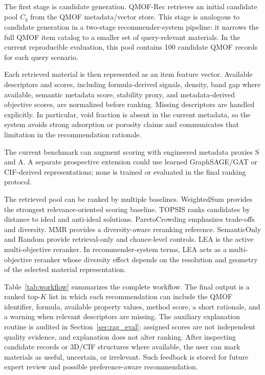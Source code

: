 \documentclass[12pt,a4paper]{article}
\begin{document}
The first stage is candidate generation. QMOF-Rec retrieves an initial candidate pool $C_q$ from the QMOF metadata/vector store. This stage is analogous to candidate generation in a two-stage recommender-system pipeline: it narrows the full QMOF item catalog to a smaller set of query-relevant materials. In the current reproducible evaluation, this pool contains 100 candidate QMOF records for each query scenario.

Each retrieved material is then represented as an item feature vector. Available descriptors and scores, including formula-derived signals, density, band gap where available, semantic metadata score, stability proxy, and metadata-derived objective scores, are normalized before ranking. Missing descriptors are handled explicitly. In particular, void fraction is absent in the current metadata, so the system avoids strong adsorption or porosity claims and communicates that limitation in the recommendation rationale.

The current benchmark can augment scoring with engineered metadata proxies S and A. A separate prospective extension could use learned GraphSAGE/GAT or CIF-derived representations; none is trained or evaluated in the final ranking protocol.

The retrieved pool can be ranked by multiple baselines. WeightedSum provides the strongest relevance-oriented scoring baseline. TOPSIS ranks candidates by distance to ideal and anti-ideal solutions. ParetoCrowding emphasizes trade-offs and diversity. MMR provides a diversity-aware reranking reference. SemanticOnly and Random provide retrieval-only and chance-level controls. LEA is the active multi-objective reranker. In recommender-system terms, LEA acts as a multi-objective reranker whose diversity effect depends on the resolution and geometry of the selected material representation.

Table~\ref{tab:workflow} summarizes the complete workflow. The final output is a ranked top-$K$ list in which each recommendation can include the QMOF identifier, formula, available property values, method score, a short rationale, and a warning when relevant descriptors are missing. The auxiliary explanation routine is audited in Section~\ref{sec:rag_eval}; assigned scores are not independent quality evidence, and explanation does not alter ranking. After inspecting candidate records or 3D/CIF structures where available, the user can mark materials as useful, uncertain, or irrelevant. Such feedback is stored for future expert review and possible preference-aware recommendation.
\end{document}
